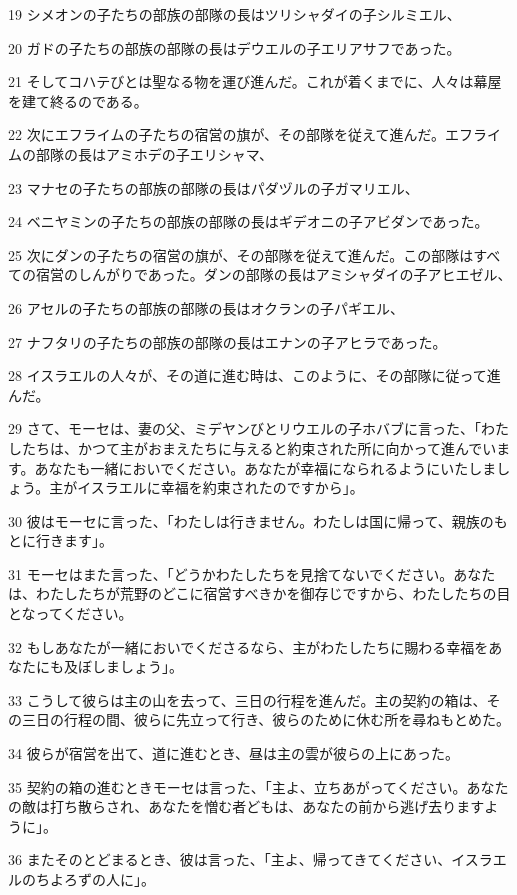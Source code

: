 \par 19 シメオンの子たちの部族の部隊の長はツリシャダイの子シルミエル、
\par 20 ガドの子たちの部族の部隊の長はデウエルの子エリアサフであった。
\par 21 そしてコハテびとは聖なる物を運び進んだ。これが着くまでに、人々は幕屋を建て終るのである。
\par 22 次にエフライムの子たちの宿営の旗が、その部隊を従えて進んだ。エフライムの部隊の長はアミホデの子エリシャマ、
\par 23 マナセの子たちの部族の部隊の長はパダヅルの子ガマリエル、
\par 24 ベニヤミンの子たちの部族の部隊の長はギデオニの子アビダンであった。
\par 25 次にダンの子たちの宿営の旗が、その部隊を従えて進んだ。この部隊はすべての宿営のしんがりであった。ダンの部隊の長はアミシャダイの子アヒエゼル、
\par 26 アセルの子たちの部族の部隊の長はオクランの子パギエル、
\par 27 ナフタリの子たちの部族の部隊の長はエナンの子アヒラであった。
\par 28 イスラエルの人々が、その道に進む時は、このように、その部隊に従って進んだ。
\par 29 さて、モーセは、妻の父、ミデヤンびとリウエルの子ホバブに言った、「わたしたちは、かつて主がおまえたちに与えると約束された所に向かって進んでいます。あなたも一緒においでください。あなたが幸福になられるようにいたしましょう。主がイスラエルに幸福を約束されたのですから」。
\par 30 彼はモーセに言った、「わたしは行きません。わたしは国に帰って、親族のもとに行きます」。
\par 31 モーセはまた言った、「どうかわたしたちを見捨てないでください。あなたは、わたしたちが荒野のどこに宿営すべきかを御存じですから、わたしたちの目となってください。
\par 32 もしあなたが一緒においでくださるなら、主がわたしたちに賜わる幸福をあなたにも及ぼしましょう」。
\par 33 こうして彼らは主の山を去って、三日の行程を進んだ。主の契約の箱は、その三日の行程の間、彼らに先立って行き、彼らのために休む所を尋ねもとめた。
\par 34 彼らが宿営を出て、道に進むとき、昼は主の雲が彼らの上にあった。
\par 35 契約の箱の進むときモーセは言った、「主よ、立ちあがってください。あなたの敵は打ち散らされ、あなたを憎む者どもは、あなたの前から逃げ去りますように」。
\par 36 またそのとどまるとき、彼は言った、「主よ、帰ってきてください、イスラエルのちよろずの人に」。

